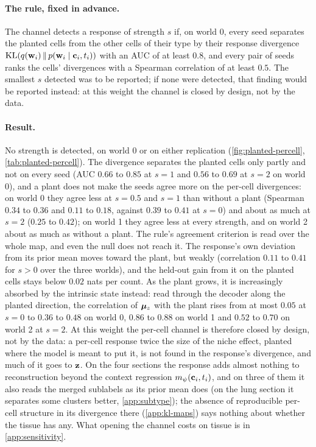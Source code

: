 \paragraph{The rule, fixed in advance.} The channel detects a response of strength $s$ if, on world 0, every seed separates the planted cells from the other cells of their type by their response divergence $\operatorname{KL}(q(\mathbf{w}_i)\,\|\,p(\mathbf{w}_i \mid \mathbf{c}_i, t_i))$ with an AUC of at least $0.8$, and every pair of seeds ranks the cells' divergences with a Spearman correlation of at least $0.5$. The smallest $s$ detected was to be reported; if none were detected, that finding would be reported instead: at this weight the channel is closed by design, not by the data.

\paragraph{Result.}  No strength is detected, on world 0 or on either replication (\cref{fig:planted-percell}, \cref{tab:planted-percell}). The divergence separates the planted cells only partly and not on every seed (AUC $0.66$ to $0.85$ at $s = 1$ and $0.56$ to $0.69$ at $s = 2$ on world 0), and a plant does not make the seeds agree more on the per-cell divergences: on world 0 they agree less at $s = 0.5$ and $s = 1$ than without a plant (Spearman $0.34$ to $0.36$ and $0.11$ to $0.18$, against $0.39$ to $0.41$ at $s = 0$) and about as much at $s = 2$ ($0.25$ to $0.42$); on world 1 they agree less at every strength, and on world 2 about as much as without a plant. The rule's agreement criterion is read over the whole map, and even the null does not reach it. The response's own deviation from its prior mean moves toward the plant, but weakly (correlation $0.11$ to $0.41$ for $s > 0$ over the three worlds), and the held-out gain from it on the planted cells stays below $0.02$ nats per count. As the plant grows, it is increasingly absorbed by the intrinsic state instead: read through the decoder along the planted direction, the correlation of $\boldsymbol{\mu}_z$ with the plant rises from at most $0.05$ at $s = 0$ to $0.36$ to $0.48$ on world 0, $0.86$ to $0.88$ on world 1 and $0.52$ to $0.70$ on world 2 at $s = 2$. At this weight the per-cell channel is therefore closed by design, not by the data: a per-cell response twice the size of the niche effect, planted where the model is meant to put it, is not found in the response's divergence, and much of it goes to $\mathbf{z}$. On the four sections the response adds almost nothing to reconstruction beyond the context regression $m_{\psi}(\mathbf{c}_i, t_i)$, and on three of them it also reads the merged sublabels as its prior mean does (on the lung section it separates some clusters better, \cref{app:subtype}); the absence of reproducible per-cell structure in its divergence there (\cref{app:kl-maps}) says nothing about whether the tissue has any. What opening the channel costs on tissue is in \cref{app:sensitivity}.

